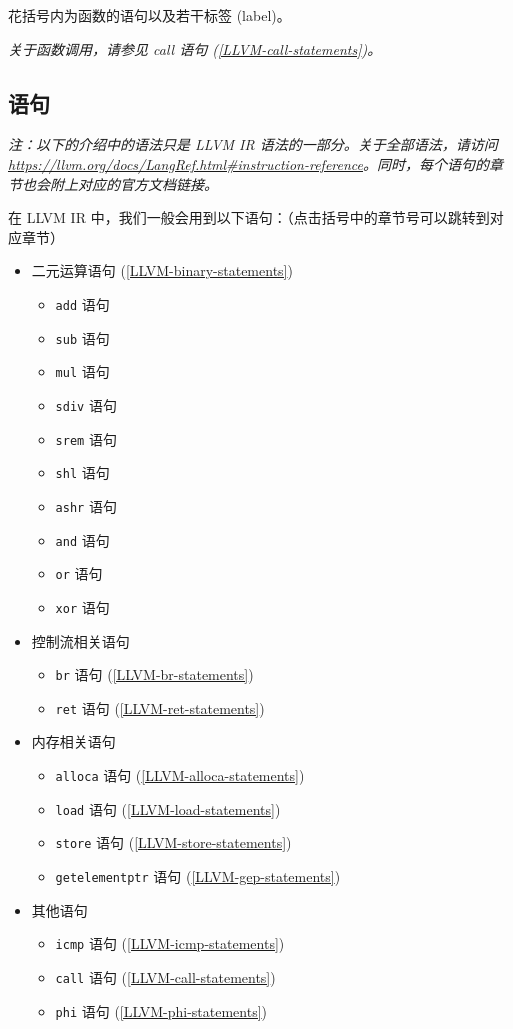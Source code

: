 花括号内为函数的语句以及若干标签 (label)。

\textit{关于函数调用，请参见 call 语句 (\ref{LLVM-call-statements})。}

\subsection{语句}\label{LLVM-statements}

\textit{注：以下的介绍中的语法只是 LLVM IR 语法的一部分。关于全部语法，请访问
\url{https://llvm.org/docs/LangRef.html\#instruction-reference}。同时，每个语句的章节也会附上对应的官方文档链接。}

在 LLVM IR 中，我们一般会用到以下语句：（点击括号中的章节号可以跳转到对应章节）

\begin{itemize}
  \item 二元运算语句 (\ref{LLVM-binary-statements})
    \begin{itemize}
      \item \texttt{add} 语句
      \item \texttt{sub} 语句
      \item \texttt{mul} 语句
      \item \texttt{sdiv} 语句
      \item \texttt{srem} 语句
      \item \texttt{shl} 语句
      \item \texttt{ashr} 语句
      \item \texttt{and} 语句
      \item \texttt{or} 语句
      \item \texttt{xor} 语句
    \end{itemize}
  \item 控制流相关语句
    \begin{itemize}
      \item \texttt{br} 语句 (\ref{LLVM-br-statements})
      \item \texttt{ret} 语句 (\ref{LLVM-ret-statements})
    \end{itemize}
  \item 内存相关语句
    \begin{itemize}
      \item \texttt{alloca} 语句 (\ref{LLVM-alloca-statements})
      \item \texttt{load} 语句 (\ref{LLVM-load-statements})
      \item \texttt{store} 语句 (\ref{LLVM-store-statements})
      \item \texttt{getelementptr} 语句 (\ref{LLVM-gep-statements})
    \end{itemize}
  \item 其他语句
    \begin{itemize}
      \item \texttt{icmp} 语句 (\ref{LLVM-icmp-statements})
      \item \texttt{call} 语句 (\ref{LLVM-call-statements})
      \item \texttt{phi} 语句 (\ref{LLVM-phi-statements})
    \end{itemize}
\end{itemize}


